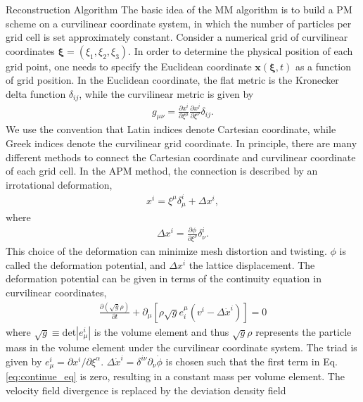 \begin{section}{Reconstruction Algorithm}
  \label{sec:reconstruction}
   The basic idea of the MM algorithm is to build a PM scheme on a curvilinear coordinate system, 
in which the number of particles per grid cell is set approximately constant. 
    Consider a numerical grid of curvilinear coordinates 
$\bm{\xi}=\left(\xi_1,\xi_2,\xi_3\right)$. In order to determine the physical position 
of each grid point, one needs to specify the Euclidean coordinate $\bm{x}(\bm{\xi},t)$ 
as a function of grid position. In the Euclidean coordinate, the flat metric is the Kronecker 
delta function $\delta_{ij}$, while the curvilinear metric is given by
\begin{align}
    g_{\mu\nu}=\frac{\partial x^i}{\partial \xi ^\mu} \frac{\partial x^j}{\partial \xi ^\nu}\delta_{ij}.
\end{align}
    We use the convention that Latin indices denote Cartesian coordinate, 
while Greek indices denote the curvilinear grid coordinate.
    In principle, there are many different methods to connect the Cartesian 
coordinate and curvilinear coordinate of each grid cell. In the APM method, the 
connection is described by an irrotational deformation,
\begin{align}
    x^i=\xi ^\mu \delta ^i _\mu + \Delta x^i,
\end{align}
where
\begin{align}
 \label{eq:disp}
    \Delta x^i=\frac{\partial \phi}{\partial \xi ^ \nu}\delta ^i _\nu .
\end{align}
    This choice of the deformation can minimize mesh distortion and twisting. $\phi$ is called 
the deformation potential, and $\Delta x^i$ the lattice displacement. The deformation potential 
can be given in terms of the continuity equation in curvilinear coordinates,
\begin{align}
 \label{eq:continue_eq}
    \frac{\partial (\sqrt{g} \rho) }{\partial t}+\partial_\mu \left[\rho \sqrt{g} e^\mu _i \left(v^i - \Delta \dot{x}^i \right) \right] =0
\end{align}
where $\sqrt{g} \equiv \mathrm{det}\left| e^i_\mu\right|$ is the volume element 
and thus $\sqrt{g} \rho$ represents the particle mass in the volume element under the curvilinear 
coordinate system. The triad is given by $e^i_\mu = \partial x^i / \partial \xi ^ \alpha$. 
$\Delta \dot{x}^i=\delta ^{i\nu}\partial _\nu \dot{\phi}$ is chosen such that the first 
term in Eq.\ref{eq:continue_eq} is zero, resulting in a constant mass per volume 
element. The velocity field divergence is replaced by the deviation density field 

\end{section}
